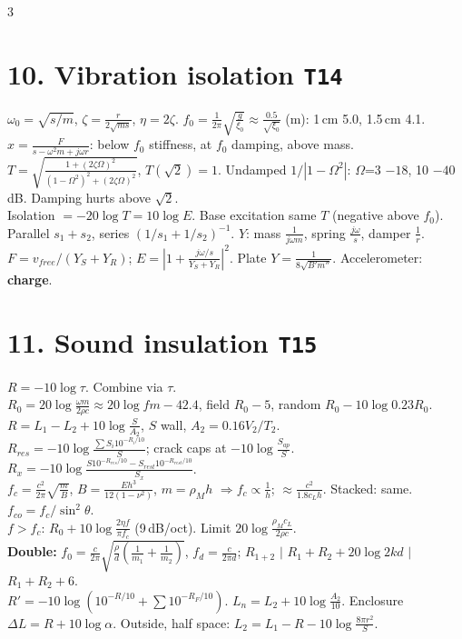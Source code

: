 \documentclass[10pt]{article}
\newcommand{\T}[1]{\textcolor{sec}{\texttt{#1}}}
\newcommand{\trap}[1]{\textcolor{trap}{#1}}
\begin{document}
\begin{multicols*}{3}
\section{10. Vibration isolation \quad\T{T14}}
$\omega_0=\sqrt{s/m}$, $\zeta=\frac{r}{2\sqrt{ms}}$, $\eta=2\zeta$. $\boxed{f_0=\frac1{2\pi}\sqrt{\frac g{\xi_0}}\approx\frac{0.5}{\sqrt{\xi_0}}}$ (m): 1\,cm 5.0, 1.5\,cm 4.1.\\
$x=\frac{F}{s-\omega^2m+j\omega r}$: below $f_0$ stiffness, at $f_0$ damping, above mass.\\
$\boxed{T=\sqrt{\frac{1+(2\zeta\Omega)^2}{(1-\Omega^2)^2+(2\zeta\Omega)^2}}}$, $T(\sqrt2)=1$. Undamped $1/|1-\Omega^2|$: $\Omega$=3 $-18$, 10 $-40$\,dB. Damping hurts above $\sqrt2$.\\
Isolation $=-20\log T=10\log E$. Base excitation same $T$ (negative above $f_0$).\\
Parallel $s_1+s_2$, series $(1/s_1+1/s_2)^{-1}$. $Y$: mass $\frac1{j\omega m}$, spring $\frac{j\omega}s$, damper $\frac1r$.\\
$F=v_{free}/(Y_S+Y_R)$; $E=|1+\frac{j\omega/s}{Y_S+Y_R}|^2$. Plate $Y=\frac1{8\sqrt{B'm''}}$. Accelerometer: \textbf{charge}.

\section{11. Sound insulation \quad\T{T15}}
$R=-10\log\tau$. \trap{Combine via $\tau$.}\\
$\boxed{R_0=20\log\frac{\omega m}{2\rho c}\approx20\log fm-42.4}$, field $R_0-5$, random $R_0-10\log0.23R_0$.\\
$\boxed{R=L_1-L_2+10\log\frac S{A_2}}$, $S$ wall, $A_2=0.16V_2/T_2$.\\
$R_{res}=-10\log\frac{\sum S_i10^{-R_i/10}}{S}$; crack caps at $-10\log\frac{S_{ap}}S$.\\
$R_x=-10\log\frac{S10^{-R_{res}/10}-S_{rest}10^{-R_{rest}/10}}{S_x}$.\\
$\boxed{f_c=\frac{c^2}{2\pi}\sqrt{\frac mB}}$, $B=\frac{Eh^3}{12(1-\nu^2)}$, $m=\rho_Mh$ $\Rightarrow f_c\propto\frac1h$; $\approx\frac{c^2}{1.8c_Lh}$. Stacked: same. $f_{co}=f_c/\sin^2\theta$.\\
$f>f_c$: $R_0+10\log\frac{2\eta f}{\pi f_c}$ (9\,dB/oct). Limit $20\log\frac{\rho_Mc_L}{2\rho c}$.\\
\textbf{Double:} $f_0=\frac c{2\pi}\sqrt{\frac\rho d(\frac1{m_1}+\frac1{m_2})}$, $f_d=\frac c{2\pi d}$; $R_{1+2}$ $|$ $R_1+R_2+20\log2kd$ $|$ $R_1+R_2+6$.\\
$R'=-10\log(10^{-R/10}+\sum10^{-R_{F}/10})$. $L_n=L_2+10\log\frac{A_2}{10}$. Enclosure $\Delta L=R+10\log\alpha$. Outside, half space: $L_2=L_1-R-10\log\frac{8\pi r^2}{S}$.


\end{multicols*}
\end{document}
